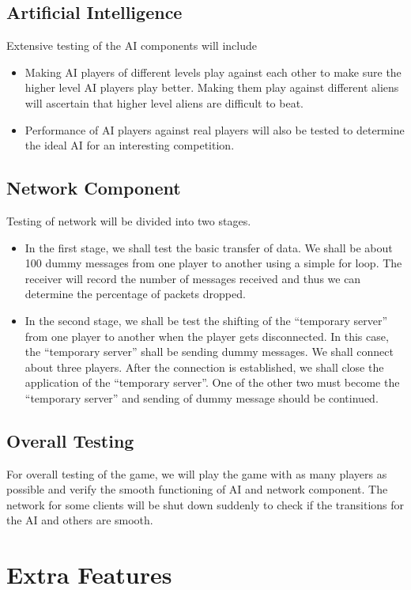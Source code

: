 \documentclass{article}
\begin{document}
			\subsection{Artificial Intelligence}
				Extensive testing of the AI components will include
				\begin{itemize} 
					\item Making AI players of different levels play against each other to make sure the higher level AI players play better. Making them play against different aliens will ascertain that higher level aliens are difficult to beat.
					\item Performance of AI players against real players will also be tested to determine the ideal AI for an interesting competition.
				\end{itemize}
			\subsection{Network Component}
				Testing of network will be divided into two stages.
					\begin{itemize}
						\item In the first stage, we shall test the basic transfer of data. We shall be about 100 dummy messages from one player to another using a simple for loop. The receiver will record the number of messages received and thus we can determine the percentage of packets dropped.
						\item In the second stage, we shall be test the shifting of the ``temporary server'' from one player to another when the player gets disconnected. In this case, the ``temporary server'' shall be sending dummy messages. We shall connect about three players. After the connection is established, we shall close the application of the ``temporary server''. One of the other two must become the ``temporary server'' and sending of dummy message should be continued.
					\end{itemize}
			\subsection{Overall Testing}
				For overall testing of the game, we will play the game with as many players as possible and verify the smooth functioning of AI and network component. The network for some clients will be shut down suddenly to check if the transitions for the AI and others are smooth.
	\section{Extra Features}
\end{document}
